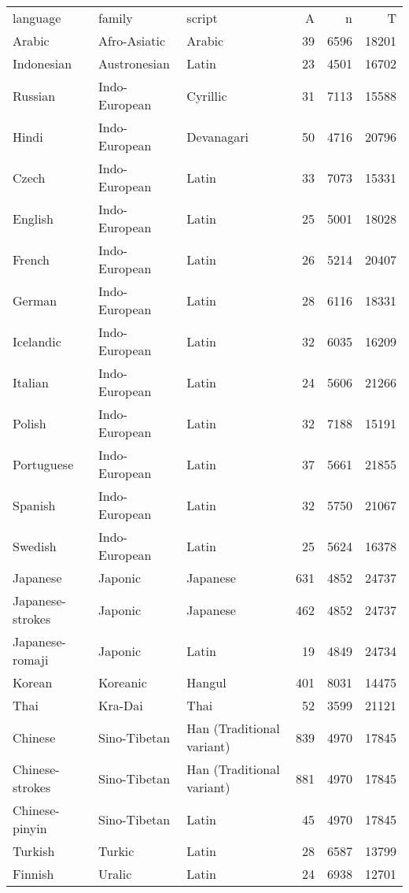 \begin{table}[ht]
\centering
\begin{tabular}{lllrrr}
 language & family & script & A & n & T \\ 
 Arabic & Afro-Asiatic & Arabic &  39 & 6596 & 18201 \\ 
  Indonesian & Austronesian & Latin &  23 & 4501 & 16702 \\ 
  Russian & Indo-European & Cyrillic &  31 & 7113 & 15588 \\ 
  Hindi & Indo-European & Devanagari &  50 & 4716 & 20796 \\ 
  Czech & Indo-European & Latin &  33 & 7073 & 15331 \\ 
  English & Indo-European & Latin &  25 & 5001 & 18028 \\ 
  French & Indo-European & Latin &  26 & 5214 & 20407 \\ 
  German & Indo-European & Latin &  28 & 6116 & 18331 \\ 
  Icelandic & Indo-European & Latin &  32 & 6035 & 16209 \\ 
  Italian & Indo-European & Latin &  24 & 5606 & 21266 \\ 
  Polish & Indo-European & Latin &  32 & 7188 & 15191 \\ 
  Portuguese & Indo-European & Latin &  37 & 5661 & 21855 \\ 
  Spanish & Indo-European & Latin &  32 & 5750 & 21067 \\ 
  Swedish & Indo-European & Latin &  25 & 5624 & 16378 \\ 
  Japanese & Japonic & Japanese & 631 & 4852 & 24737 \\ 
  Japanese-strokes & Japonic & Japanese & 462 & 4852 & 24737 \\ 
  Japanese-romaji & Japonic & Latin &  19 & 4849 & 24734 \\ 
  Korean & Koreanic & Hangul & 401 & 8031 & 14475 \\ 
  Thai & Kra-Dai & Thai &  52 & 3599 & 21121 \\ 
  Chinese & Sino-Tibetan & Han (Traditional variant) & 839 & 4970 & 17845 \\ 
  Chinese-strokes & Sino-Tibetan & Han (Traditional variant) & 881 & 4970 & 17845 \\ 
  Chinese-pinyin & Sino-Tibetan & Latin &  45 & 4970 & 17845 \\ 
  Turkish & Turkic & Latin &  28 & 6587 & 13799 \\ 
  Finnish & Uralic & Latin &  24 & 6938 & 12701 \\ 
   \hline
\end{tabular}
\end{table}
